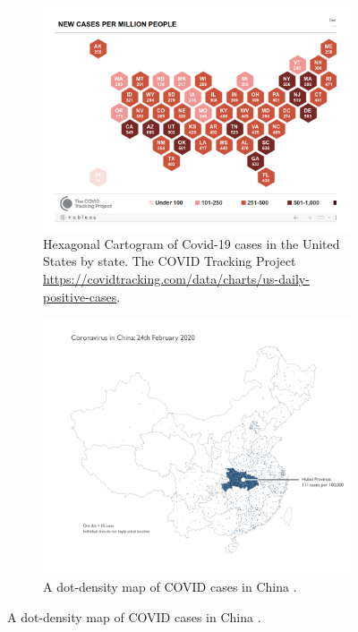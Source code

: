 \documentclass[article]{jdssv}\usepackage[]{graphicx}\usepackage[]{xcolor}
\begin{document}
\begin{figure}
\centering
\begin{subfigure}[c]{.45\textwidth}
\includegraphics[width=\textwidth]{covid-tracking-hex-cartogram}
\caption{Hexagonal Cartogram of Covid-19 cases in the United States by state. The COVID Tracking Project \url{https://covidtracking.com/data/charts/us-daily-positive-cases}.}\label{fig:hex-cartogram}
\end{subfigure}\hfill
\begin{subfigure}[c]{.45\textwidth}
\includegraphics[width=\textwidth]{china-dotmap}
\caption{A dot-density map of COVID cases in China \citep{fieldMappingCoronavirusResponsibly}.}\label{fig:china-dot-map}

\end{subfigure}
\end{figure}
\end{document}
